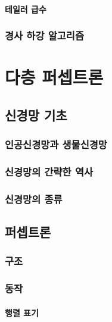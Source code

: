 \documentclass [12pt] {oblivoir}
\let\oldsubsubsection=\subsubsection
\renewcommand{\subsubsection}
{
  \filbreak
  \oldsubsubsection
}
\begin{document}
\vspace{3mm}

\paragraph*{테일러 급수}\mbox{}

\vspace{3mm}

\subsubsection{경사 하강 알고리즘}

\newpage
\section{다층 퍼셉트론}

\subsection{신경망 기초}

\subsubsection{인공신경망과 생물신경망}

\subsubsection{신경망의 간략한 역사}

\subsubsection{신경망의 종류}

\subsection{퍼셉트론}

\subsubsection{구조}

\subsubsection{동작}

\paragraph*{행렬 표기}\mbox{}
\end{document}
